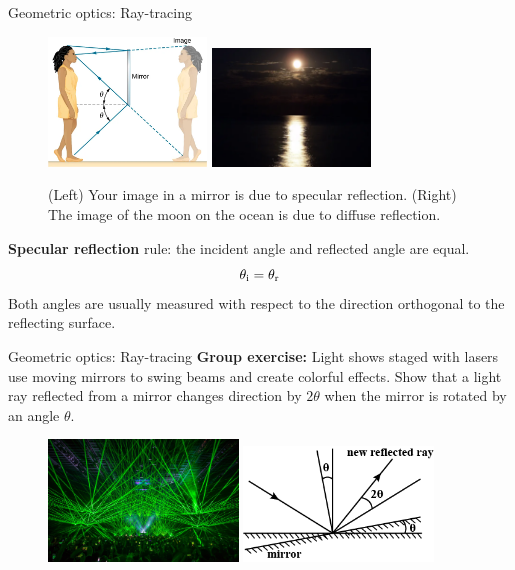 \documentclass{beamer}
\begin{document}
\begin{frame}{Geometric optics: Ray-tracing}
\begin{figure}
\includegraphics[width=0.375\textwidth]{figures/geo6.png}
\includegraphics[width=0.375\textwidth]{figures/geo2.png}
\caption{\label{fig:geo2} \footnotesize (Left) Your image in a mirror is due to specular reflection. (Right) The image of the moon on the ocean is due to diffuse reflection.}
\end{figure}
\small
\textbf{\alert{Specular reflection}} rule: the incident angle and reflected angle are equal.
\begin{equation}
\theta_{\rm i} = \theta_{\rm r}
\end{equation}
Both angles are usually measured with respect to the direction orthogonal to the reflecting surface.
\end{frame}

\begin{frame}{Geometric optics: Ray-tracing}
\textbf{Group exercise:} Light shows staged with lasers use moving mirrors to swing beams and create colorful effects. Show that a light ray reflected from a mirror changes direction by $2\theta$ when the mirror is rotated by an angle $\theta$.
\begin{figure}
\centering
\includegraphics[width=0.45\textwidth]{figures/laserface.jpg}
\includegraphics[width=0.45\textwidth]{figures/mirror.png}
\end{figure}
\end{frame}
\end{document}
